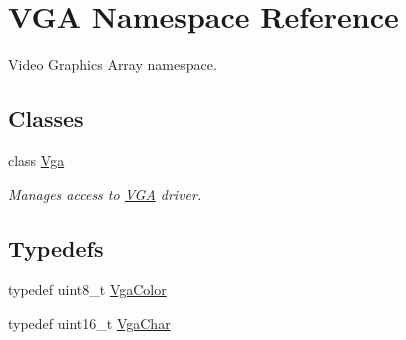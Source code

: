 \hypertarget{namespace_v_g_a}{}\section{V\+GA Namespace Reference}
\label{namespace_v_g_a}


Video Graphics Array namespace.  


\subsection*{Classes}
\begin{DoxyCompactItemize}
\item 
class \hyperlink{class_v_g_a_1_1_vga}{Vga}
\begin{DoxyCompactList}\small\item\em Manages access to \hyperlink{namespace_v_g_a}{V\+GA} driver. \end{DoxyCompactList}\end{DoxyCompactItemize}
\subsection*{Typedefs}
\begin{DoxyCompactItemize}
\item 
typedef uint8\+\_\+t \hyperlink{namespace_v_g_a_afa3882cddefd08a3f33aaf6fcbcbcd7f}{Vga\+Color}
\item 
typedef uint16\+\_\+t \hyperlink{namespace_v_g_a_adb876ce4a116e09f39708ca16ef25f74}{Vga\+Char}
\end{DoxyCompactItemize}
